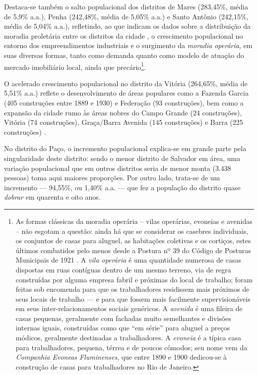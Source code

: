 Destaca-se também o salto populacional dos distritos de Mares (283,45\%, média de 5,9\% a.a.), Penha (242,48\%, média de 5,05\% a.a.) e Santo Antônio (242,15\%, média de 5,04\% a.a.), refletindo, ao que indicam os dados sobre a distribuição da moradia proletária entre os distritos da cidade \cite[p.~126]{cardoso_vilas_1991}, o crescimento populacional no entorno dos empreendimentos industriais e o surgimento da \textit{moradia operária}, em suas diversas formas, tanto como demanda quanto como modelo de atuação do mercado imobiliário local, ainda que precário\footnote{As formas clássicas da moradia operária -- vilas operárias, evoneias e avenidas -- não esgotam a questão: ainda há que se considerar os casebres individuais, os conjuntos de casas para aluguel, as habitações coletivas e os cortiços, estes últimos combatidos pelo menos desde a Postura nº 39 do Código de Posturas Municipais de 1921 \cite{PREFEITURA1921}. A \textit{vila operária} é uma quantidade numerosa de casas dispostas em ruas contíguas dentro de um mesmo terreno, via de regra construídas por alguma empresa fabril e próximas do local de trabalho; foram feitas sob encomenda para que os trabalhadores residissem mais próximos de seus locais de trabalho --- e para que fossem mais facilmente supervisionáveis em seus inter-relacionamentos sociais genéricos. A \textit{avenida} é uma fileira de casas pequenas, geralmente com fachadas muito semelhantes e divisões internas iguais, construídas como que ``em série'' para aluguel a preços módicos, geralmente destinadas a trabalhadores. A \textit{evoneia} é a típica casa para trabalhadores, pequena, térrea e de poucos cômodos; seu nome vem da \textit{Companhia Evoneas Fluminenses}, que entre 1890 e 1900 dedicou-se à construção de casas para trabalhadores no Rio de Janeiro. }.

O acelerado crescimento populacional no distrito da Vitória (264,65\%, média de 5,51\% a.a.) reflete o desenvolvimento de áreas populares como a Fazenda Garcia (405 construções entre 1889 e 1930) e Federação (93 construções), bem como a expansão da cidade rumo às áreas nobres do Campo Grande (24 construções), Vitória (74 construções), Graça/Barra Avenida (145 construções) e Barra (225 construções) \cite[p.~295]{almeida_victoria_1997}.

No distrito do Paço, o incremento populacional explica-se em grande parte pela singularidade deste distrito: sendo o menor distrito de Salvador em área, uma variação populacional que em outros distritos seria de menor monta (3.438 pessoas) toma aqui maiores proporções. Por outro lado, trata-se de um incremento --- 94,55\%, ou 1,40\% a.a. --- que fez a população do distrito quase \textit{dobrar} em quarenta e oito anos.

